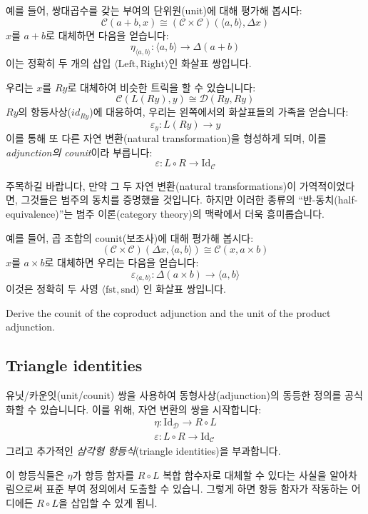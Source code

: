 \documentclass[DaoFP]{subfiles}
\begin{document}
예를 들어, 쌍대곱수를 갖는 부여의 단위원(unit)에 대해 평가해 봅시다:
\[  \mathcal{C} (a + b, x) \cong (\mathcal{C} \times \mathcal{C})( \langle a, b \rangle , \Delta x)\]
$x$를 $a + b$로 대체하면 다음을 얻습니다:
\[ \eta_{\langle a, b \rangle} \colon \langle a, b \rangle \to \Delta(a + b) \]
이는 정확히 두 개의 삽입 $\langle \text{Left}, \text{Right} \rangle$인 화살표 쌍입니다.

우리는 $x$를 $R y$로 대체하여 비슷한 트릭을 할 수 있습니니다:
\[  \mathcal{C} (L (R y), y) \cong \mathcal{D}( R y , R y)\]
$R y$의 항등사상($id_{R y}$)에 대응하여, 우리는 왼쪽에서의 화살표들의 가족을 얻습니다:
\[ \varepsilon_y \colon L (R y) \to y \]
이를 통해 또 다른 자연 변환(natural transformation)을 형성하게 되며, 이를 \emph{adjunction의 counit}이라 부릅니다:
\[ \varepsilon \colon L \circ R \to \text{Id}_{\mathcal{C}}  \]

주목하길 바랍니다, 만약 그 두 자연 변환(natural transformations)이 가역적이었다면, 그것들은 범주의 동치를 증명했을 것입니다. 하지만 이러한 종류의 ``반-동치(half-equivalence)''는 범주 이론(category theory)의 맥락에서 더욱 흥미롭습니다.

예를 들어, 곱 조합의 counit(보조사)에 대해 평가해 봅시다:
\[  (\mathcal{C} \times \mathcal{C})( \Delta x,  \langle a, b \rangle ) \cong  \mathcal{C} (x, a \times b)  \]
$x$를 $a \times b$로 대체하면 우리는 다음을 얻습니다:
\[ \varepsilon_{\langle a, b \rangle} \colon \Delta (a \times b) \to \langle a, b \rangle \]
이것은 정확히 두 사영 $\langle \text{fst}, \text{snd} \rangle$ 인 화살표 쌍입니다.

\begin{exercise}
Derive the counit of the coproduct adjunction and the unit of the product adjunction.
\end{exercise}

\subsection{Triangle identities}

유닛/카운잇(unit/counit) 쌍을 사용하여 동형사상(adjunction)의 동등한 정의를 공식화할 수 있습니니다. 이를 위해, 자연 변환의 쌍을 시작합니다:
\begin{align*}
\eta \colon \text{Id}_{\mathcal{D}} \to R \circ L \\
\varepsilon \colon L \circ R \to \text{Id}_{\mathcal{C}}
\end{align*}
그리고 추가적인 \emph{삼각형 항등식}(triangle identities)을 부과합니다.

이 항등식들은 $\eta$가 항등 함자를 $R \circ L$ 복합 함수자로 대체할 수 있다는 사실을 알아차림으로써 표준 부여 정의에서 도출할 수 있습니. 그렇게 하면 항등 함자가 작동하는 어디에든 $R \circ L$을 삽입할 수 있게 됩니.
\end{document}
